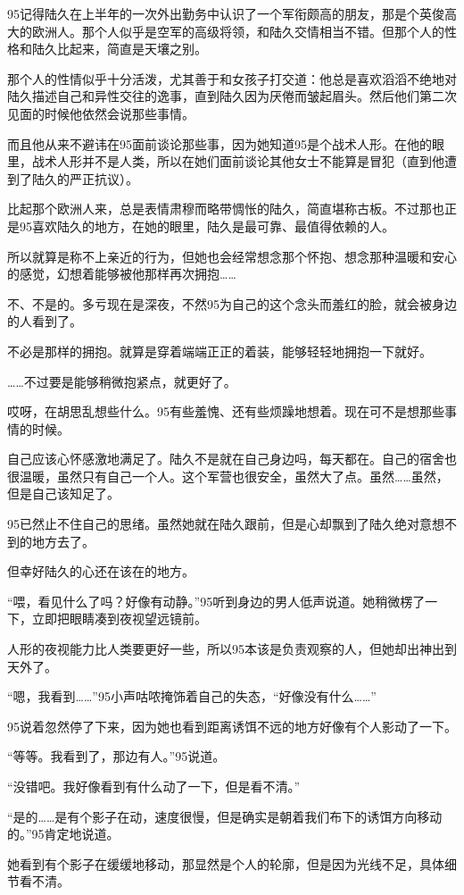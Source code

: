 95记得陆久在上半年的一次外出勤务中认识了一个军衔颇高的朋友，那是个英俊高大的欧洲人。那个人似乎是空军的高级将领，和陆久交情相当不错。但那个人的性格和陆久比起来，简直是天壤之别。

那个人的性情似乎十分活泼，尤其善于和女孩子打交道：他总是喜欢滔滔不绝地对陆久描述自己和异性交往的逸事，直到陆久因为厌倦而皱起眉头。然后他们第二次见面的时候他依然会说那些事情。

而且他从来不避讳在95面前谈论那些事，因为她知道95是个战术人形。在他的眼里，战术人形并不是人类，所以在她们面前谈论其他女士不能算是冒犯（直到他遭到了陆久的严正抗议）。

比起那个欧洲人来，总是表情肃穆而略带惆怅的陆久，简直堪称古板。不过那也正是95喜欢陆久的地方，在她的眼里，陆久是最可靠、最值得依赖的人。

所以就算是称不上亲近的行为，但她也会经常想念那个怀抱、想念那种温暖和安心的感觉，幻想着能够被他那样再次拥抱……

不、不是的。多亏现在是深夜，不然95为自己的这个念头而羞红的脸，就会被身边的人看到了。

不必是那样的拥抱。就算是穿着端端正正的着装，能够轻轻地拥抱一下就好。

……不过要是能够稍微抱紧点，就更好了。

哎呀，在胡思乱想些什么。95有些羞愧、还有些烦躁地想着。现在可不是想那些事情的时候。

自己应该心怀感激地满足了。陆久不是就在自己身边吗，每天都在。自己的宿舍也很温暖，虽然只有自己一个人。这个军营也很安全，虽然大了点。虽然……虽然，但是自己该知足了。

95已然止不住自己的思绪。虽然她就在陆久跟前，但是心却飘到了陆久绝对意想不到的地方去了。

但幸好陆久的心还在该在的地方。

“喂，看见什么了吗？好像有动静。”95听到身边的男人低声说道。她稍微楞了一下，立即把眼睛凑到夜视望远镜前。

人形的夜视能力比人类要更好一些，所以95本该是负责观察的人，但她却出神出到天外了。

“嗯，我看到……”95小声咕哝掩饰着自己的失态，“好像没有什么……”

95说着忽然停了下来，因为她也看到距离诱饵不远的地方好像有个人影动了一下。

“等等。我看到了，那边有人。”95说道。

“没错吧。我好像看到有什么动了一下，但是看不清。”

“是的……是有个影子在动，速度很慢，但是确实是朝着我们布下的诱饵方向移动的。”95肯定地说道。

她看到有个影子在缓缓地移动，那显然是个人的轮廓，但是因为光线不足，具体细节看不清。

